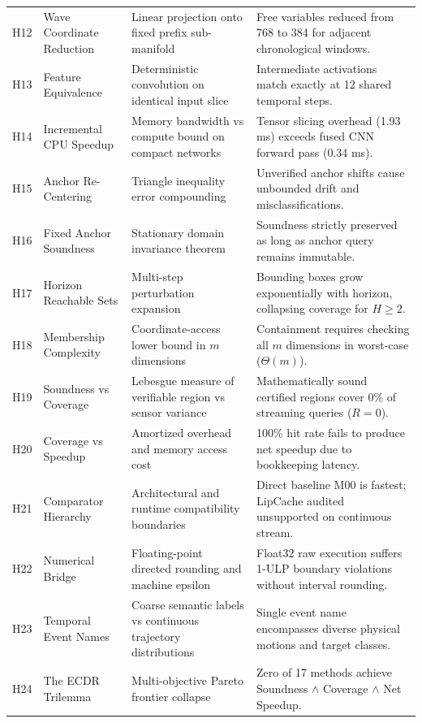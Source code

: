 \documentclass[11pt,article]{article}
\theoremstyle{definition}
\begin{document}
\begin{table}[t]
{\begin{tabular}{clll}
H12 & Wave Coordinate Reduction & Linear projection onto fixed prefix sub-manifold & Free variables reduced from 768 to 384 for adjacent chronological windows. \\
H13 & Feature Equivalence & Deterministic convolution on identical input slice & Intermediate activations match exactly at 12 shared temporal steps. \\
H14 & Incremental CPU Speedup & Memory bandwidth vs compute bound on compact networks & Tensor slicing overhead (1.93 ms) exceeds fused CNN forward pass (0.34 ms). \\
H15 & Anchor Re-Centering & Triangle inequality error compounding & Unverified anchor shifts cause unbounded drift and misclassifications. \\
H16 & Fixed Anchor Soundness & Stationary domain invariance theorem & Soundness strictly preserved as long as anchor query remains immutable. \\
H17 & Horizon Reachable Sets & Multi-step perturbation expansion & Bounding boxes grow exponentially with horizon, collapsing coverage for $H \ge 2$. \\
H18 & Membership Complexity & Coordinate-access lower bound in $m$ dimensions & Containment requires checking all $m$ dimensions in worst-case ($\Theta(m)$). \\
H19 & Soundness vs Coverage & Lebesgue measure of verifiable region vs sensor variance & Mathematically sound certified regions cover 0\% of streaming queries ($R=0$). \\
H20 & Coverage vs Speedup & Amortized overhead and memory access cost & 100\% hit rate fails to produce net speedup due to bookkeeping latency. \\
H21 & Comparator Hierarchy & Architectural and runtime compatibility boundaries & Direct baseline M00 is fastest; LipCache audited unsupported on continuous stream. \\
H22 & Numerical Bridge & Floating-point directed rounding and machine epsilon & Float32 raw execution suffers 1-ULP boundary violations without interval rounding. \\
H23 & Temporal Event Names & Coarse semantic labels vs continuous trajectory distributions & Single event name encompasses diverse physical motions and target classes. \\
H24 & The ECDR Trilemma & Multi-objective Pareto frontier collapse & Zero of 17 methods achieve Soundness $\land$ Coverage $\land$ Net Speedup. \\
\bottomrule
\end{tabular}%
}
\end{table}
\end{document}
